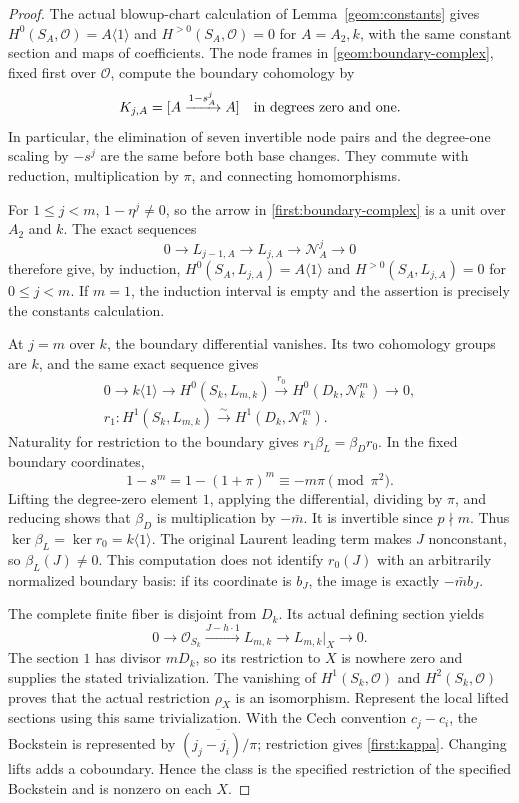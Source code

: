 \begin{proof}
The actual blowup-chart calculation of Lemma~\ref{geom:constants} gives
$H^0(S_A,\mathcal O)=A\langle1\rangle$ and $H^{>0}(S_A,\mathcal O)=0$
for $A=A_2,k$, with the same constant section and maps of coefficients.
The node frames in \eqref{geom:boundary-complex}, fixed first over
$\mathcal O$, compute the boundary cohomology by
\begin{equation}
 K_{j,A}=[A\xrightarrow{1-s_A^j}A]
 \quad\hbox{in degrees zero and one}.
 \label{first:boundary-complex}
\end{equation}
In particular, the elimination of seven invertible node pairs and the
degree-one scaling by $-s^j$ are the same before both base changes.
They commute with reduction, multiplication by $\pi$, and connecting
homomorphisms.

For $1\le j<m$, $1-\eta^j\ne0$, so the arrow in
\eqref{first:boundary-complex} is a unit over $A_2$ and $k$.
The exact sequences
\[
 0\longrightarrow L_{j-1,A}\longrightarrow L_{j,A}
 \longrightarrow\mathcal N_A^j\longrightarrow0
\]
therefore give, by induction,
$H^0(S_A,L_{j,A})=A\langle1\rangle$ and $H^{>0}(S_A,L_{j,A})=0$
for $0\le j<m$. If $m=1$, the induction interval is empty and the
assertion is precisely the constants calculation.

At $j=m$ over $k$, the boundary differential vanishes. Its two
cohomology groups are $k$, and the same exact sequence gives
\[
 \begin{gathered}
 0\longrightarrow k\langle1\rangle\longrightarrow H^0(S_k,L_{m,k})
 \xrightarrow{r_0}H^0(D_k,\mathcal N_k^m)\longrightarrow0,\\
 r_1:H^1(S_k,L_{m,k})\xrightarrow{\sim}H^1(D_k,\mathcal N_k^m).
 \end{gathered}
\]
Naturality for restriction to the boundary gives
$r_1\beta_L=\beta_Dr_0$. In the fixed boundary coordinates,
\[
 1-s^m=1-(1+\pi)^m\equiv-m\pi\pmod{\pi^2}.
\]
Lifting the degree-zero element $1$, applying the differential, dividing
by $\pi$, and reducing shows that $\beta_D$ is multiplication by
$-\bar m$. It is invertible since $p\nmid m$. Thus
$\ker\beta_L=\ker r_0=k\langle1\rangle$. The original Laurent leading
term makes $J$ nonconstant, so $\beta_L(J)\ne0$. This computation does
not identify $r_0(J)$ with an arbitrarily normalized boundary basis:
if its coordinate is $b_J$, the image is exactly $-\bar m b_J$.

The complete finite fiber is disjoint from $D_k$. Its actual defining
section yields
\[
 0\longrightarrow\mathcal O_{S_k}
 \xrightarrow{J-h\cdot1}L_{m,k}
 \longrightarrow L_{m,k}|_X\longrightarrow0.
\]
The section $1$ has divisor $mD_k$, so its restriction to $X$ is
nowhere zero and supplies the stated trivialization. The vanishing of
$H^1(S_k,\mathcal O)$ and $H^2(S_k,\mathcal O)$ proves that the actual
restriction $\rho_X$ is an isomorphism. Represent the local lifted
sections using this same trivialization. With the Cech convention
$c_j-c_i$, the Bockstein is represented by
$\overline{(j_j-j_i)/\pi}$; restriction gives \eqref{first:kappa}.
Changing lifts adds a coboundary. Hence the class is the specified
restriction of the specified Bockstein and is nonzero on each $X$.
\end{proof}

